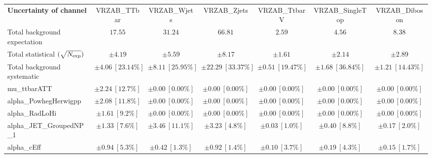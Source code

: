 
\begin{sidewaystable}
\begin{center}
\setlength{\tabcolsep}{0.0pc}
\begin{tabular*}{\textwidth}{@{\extracolsep{\fill}}lcccccc}
\noalign{\smallskip}\hline\noalign{\smallskip}
{\bf Uncertainty of channel}                                    & VRZAB\_TTbar            & VRZAB\_Wjets            & VRZAB\_Zjets            & VRZAB\_TtbarV            & VRZAB\_SingleTop            & VRZAB\_Diboson            \\
\noalign{\smallskip}\hline\noalign{\smallskip}
Total background expectation             &  $17.55$        &  $31.24$        &  $66.81$        &  $2.59$        &  $4.56$        &  $8.38$       \\
\noalign{\smallskip}\hline\noalign{\smallskip}
Total statistical $(\sqrt{N_{\rm exp}})$              & $\pm 4.19$        & $\pm 5.59$        & $\pm 8.17$        & $\pm 1.61$        & $\pm 2.14$        & $\pm 2.89$       \\
Total background systematic               & $\pm 4.06\ [23.14\%] $        & $\pm 8.11\ [25.95\%] $        & $\pm 22.29\ [33.37\%] $        & $\pm 0.51\ [19.47\%] $        & $\pm 1.68\ [36.84\%] $        & $\pm 1.21\ [14.43\%] $             \\
\noalign{\smallskip}\hline\noalign{\smallskip}
\noalign{\smallskip}\hline\noalign{\smallskip}
mu\_ttbarATT         & $\pm 2.24\ [12.7\%] $          & $\pm 0.00\ [0.00\%] $          & $\pm 0.00\ [0.00\%] $          & $\pm 0.00\ [0.00\%] $          & $\pm 0.00\ [0.00\%] $          & $\pm 0.00\ [0.00\%] $       \\
alpha\_PowhegHerwigpp         & $\pm 2.08\ [11.8\%] $          & $\pm 0.00\ [0.00\%] $          & $\pm 0.00\ [0.00\%] $          & $\pm 0.00\ [0.00\%] $          & $\pm 0.00\ [0.00\%] $          & $\pm 0.00\ [0.00\%] $       \\
alpha\_RadLoHi         & $\pm 1.61\ [9.2\%] $          & $\pm 0.00\ [0.00\%] $          & $\pm 0.00\ [0.00\%] $          & $\pm 0.00\ [0.00\%] $          & $\pm 0.00\ [0.00\%] $          & $\pm 0.00\ [0.00\%] $       \\
alpha\_JET\_GroupedNP\_1         & $\pm 1.33\ [7.6\%] $          & $\pm 3.46\ [11.1\%] $          & $\pm 3.23\ [4.8\%] $          & $\pm 0.03\ [1.0\%] $          & $\pm 0.40\ [8.8\%] $          & $\pm 0.17\ [2.0\%] $       \\
alpha\_cEff         & $\pm 0.94\ [5.3\%] $          & $\pm 0.42\ [1.3\%] $          & $\pm 0.92\ [1.4\%] $          & $\pm 0.10\ [3.7\%] $          & $\pm 0.19\ [4.3\%] $          & $\pm 0.15\ [1.7\%] $       \\

\end{tabular*}
\end{center}
\end{sidewaystable}
